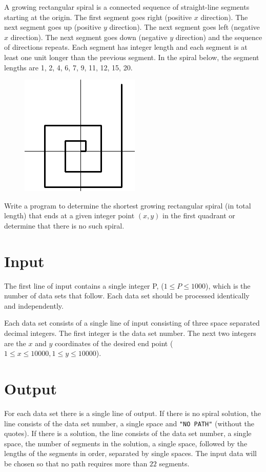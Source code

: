 
A growing rectangular spiral is a connected sequence of straight-line
segments starting at the origin. The first segment goes right (positive
$x$ direction).  The next segment goes up (positive $y$ direction). The
next segment goes left (negative $x$ direction).  The next segment goes
down (negative $y$ direction) and the sequence of directions repeats.
Each segment has integer length and each segment is at least one unit
longer than the previous segment.  In the spiral below, the segment
lengths are 1, 2, 4, 6, 7, 9, 11, 12, 15, 20.

\begin{figure}[!h]
    \begin{center}
        \includegraphics[]{g1.png} \\
    \end{center}
\end{figure}

Write a program to determine the shortest growing rectangular spiral
(in total length) that ends at a given integer point $(x,y)$ in the first
quadrant or determine that there is no such spiral.

\section*{Input}

The first line of input contains a single integer P, ($1 \le P \le 1000$),
which is the number of data sets that follow.  Each data set should be
processed identically and independently.

Each data set consists of a single line of input consisting of three space
separated decimal integers.  The first integer is the data set number.
The next two integers are the $x$ and $y$ coordinates of the desired end point
($1 \le x \le 10000, 1 \le y \le 10000$).

\section*{Output}

For each data set there is a single line of output.  If there is no
spiral solution, the line consists of the data set number, a single
space and \texttt{"NO PATH"} (without the quotes).  If there is a solution,
the line consists of the data set number, a single space, the number of
segments in the solution, a single space, followed by the lengths of the
segments in order, separated by single spaces.  The input data will be
chosen so that no path requires more than $22$ segments.

